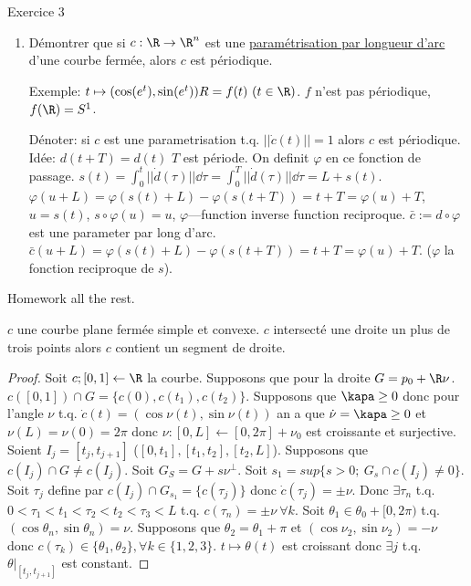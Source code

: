 		Exercice 3
		\begin{enumerate}
			\item Démontrer que si $c:\R\rightarrow\R^n$ est une \underline{paramétrisation par longueur d'arc} d'une courbe fermée, alors $c$ est périodique.
	
			Exemple: $t\mapsto (\cos(e^t),\sin(e^t))R=f(t)\ (t\in \R)$. $f$ n'est pas périodique, $f(\R)=S^1$.
	
			Dénoter: si $c$ est une parametrisation t.q. $||\dot c(t)||=1$ alors $c$ est périodique.
			Idée: $d(t+T)=d(t)$ $T$ est période. On definit $\varphi$ en ce fonction de passage. $s(t)=\int_0^t||\dot d(\tau)||\dd{\tau}=\int_0^T||\dot d(\tau)||\dd{\tau}=L+s(t)$.
			$\varphi(u+L)=\varphi(s(t)+L)-\varphi(s(t+T))=t+T=\varphi(u)+T$, $u=s(t)$, $s\circ\varphi(u)=u$, $\varphi$---function inverse function reciproque. $\bar c:=d\circ \varphi$ est une parameter par long d'arc. $\bar c(u+L)=\varphi(s(t)+L)-\varphi(s(t+T))=t+T=\varphi(u)+T$. ($\varphi$ la fonction reciproque de $s$).
		\end{enumerate}

		Homework all the rest.

		\begin{lemme} 
			$c$ une courbe plane fermée simple et convexe. $c$ intersecté une droite un plus de trois points alors $c$ contient un segment de droite.
			\end{lemme} 
			\begin{proof}
				Soit $c;[0,1]\leftarrow  \R$ la courbe.
				Supposons que pour la droite $G=p_0+\R \nu$. $c([0,1])\cap G=\{c(0),c(t_1),c(t_2)\}$. Supposons que $\kapa\geq 0$ donc pour l'angle $\nu$ t.q. $\dot c(t)=(\cos \nu (t),\sin \nu (t))$ an a que $\dot \nu=\kapa\geq 0$ et $\nu(L)=\nu(0)=2\pi$ donc $\nu:[0,L]\leftarrow [0,2\pi]+\nu_0$ est croissante et surjective. Soient $I_j=[t_j,t_{j+1}]$ ($[0,t_1],[t_1,t_2],[t_2,L]$).
				Supposons que $c(I_j)\cap G\neq c(I_j)$. Soit $G_S=G+s\nu^\perp$. Soit $s_1=sup\{s>0;\ G_s\cap c(I_j)\neq 0\}$. Soit $\tau_j$ define par $c(I_j)\cap G_{s_1}=\{c(\tau_j)\}$ donc $\dot c (\tau_j)=\pm\nu$. Donc $\exists \tau_n$ t.q. $0<\tau_1<t_1<\tau_2<t_2<\tau_3<L$ t.q. $c(\tau_n)=\pm \nu\ \forall k$. Soit $\theta_1\in\theta_0+[0,2\pi)$ t.q. $(\cos \theta_n,\sin \theta_n)=\nu$. Supposons que $\theta_2=\theta_1+\pi$ et $(\cos\nu_2,\sin\nu_2)=-\nu$ donc $c(\tau_k)\in\{\theta_1,\theta_2\},\forall k\in\{1,2,3\}$. $t\mapsto\theta(t)$ est croissant donc $\exists j$ t.q. $\theta|_[t_j,t_{j+1}]$ est constant.
			\end{proof}

